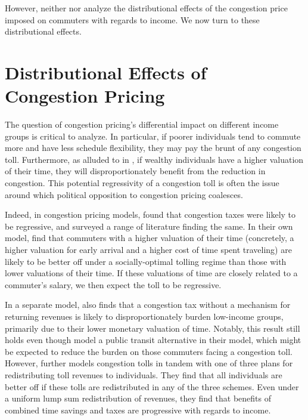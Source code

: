 \documentclass[JEL]{AEA}
\begin{document}
However, neither \cite{kreindler-2018} nor \cite{olszweski-2005} analyze the distributional effects of the congestion price imposed on commuters with regards to income. We now turn to these distributional effects.

\section{Distributional Effects of Congestion Pricing}
\label{distributional-effects}

The question of congestion pricing's differential impact on different income groups is critical to analyze. In particular, if poorer individuals tend to commute more and have less schedule flexibility, they may pay the brunt of any congestion toll. Furthermore, as alluded to in \cite{arnott-1994}, if wealthy individuals have a higher valuation of their time, they will disproportionately benefit from the reduction in congestion. This potential regressivity of a congestion toll is often the issue around which political opposition to congestion pricing coalesces.

Indeed, in congestion pricing models, \cite{arnott-1994} found that congestion taxes were likely to be regressive, and surveyed a range of literature finding the same. In their own model, \cite{arnott-1994} find that commuters with a higher valuation of their time (concretely, a higher valuation for early arrival and a higher cost of time spent traveling) are likely to be better off under a socially-optimal tolling regime than those with lower valuations of their time. If these valuations of time are closely related to a commuter's salary, we then expect the toll to be regressive.

In a separate model, \cite{small-1983} also finds that a congestion tax without a mechanism for returning revenues is likely to disproportionately burden low-income groups, primarily due to their lower monetary valuation of time. Notably, this result still holds even though \cite{small-1983} model a public transit alternative in their model, which might be expected to reduce the burden on those commuters facing a congestion toll. However, \cite{small-1983} further models congestion tolls in tandem with one of three plans for redistributing toll revenues to individuals. They find that all individuals are better off if these tolls are redistributed in any of the three schemes. Even under a uniform lump sum redistribution of revenues, they find that benefits of combined time savings and taxes are progressive with regards to income.
\end{document}
